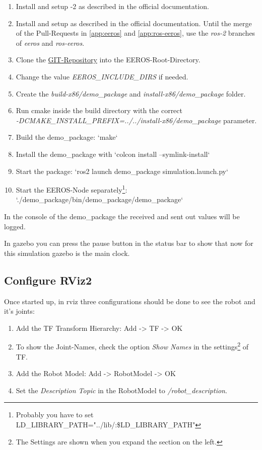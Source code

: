 \begin{enumerate}
    \item Install and setup -2 as described in the official documentation.
    \item Install and setup  as described in the official documentation.
    Until the merge of the Pull-Requests in \ref{app:eeros} and \ref{app:ros-eeros}, use the \textit{ros-2} branches of \textit{eeros} and \textit{ros-eeros}.
    \item Clone the \href{https://github.com/LukyLuke/mse_vt_eeros}{GIT-Repository} into the EEROS-Root-Directory.
    \item Change the value \textit{EEROS\_INCLUDE\_DIRS} if needed.
    \item Create the \textit{build-x86/demo\_package} and \textit{install-x86/demo\_package} folder.
    \item Run cmake inside the build directory with the correct\\
    \textit{-DCMAKE\_INSTALL\_PREFIX=../../install-x86/demo\_package} parameter.
    \item Build the demo\_package: `make`
    \item Install the demo\_package with `colcon install --symlink-install`
    \item Start the package: `ros2 launch demo\_package simulation.launch.py`
    \item Start the EEROS-Node separately\footnote{Probably you have to set LD\_LIBRARY\_PATH="../lib/:\$LD\_LIBRARY\_PATH"}: `./demo\_package/bin/demo\_package/demo\_package`
\end{enumerate}

In the console of the demo\_package the received and sent out values will be logged.

In \Gls{gazebo} you can press the pause button in the status bar to show that now for this simulation \Gls{gazebo} is the main clock.


\subsection[Rviz2 Config]{Configure RViz2} \label{sec:demo-rviz2-config}

Once started up, in \Gls{rviz} three configurations should be done to see the robot and it's joints:

\begin{enumerate}
    \item Add the TF Transform Hierarchy: Add -> TF -> OK
    \item To show the Joint-Names, check the option \textit{Show Names} in the settings\footnote{The Settings are shown when you expand the section on the left.} of TF.
    \item Add the Robot Model: Add -> RobotModel -> OK
    \item Set the \textit{Description Topic} in the RobotModel to \textit{/robot\_description}.
\end{enumerate}

